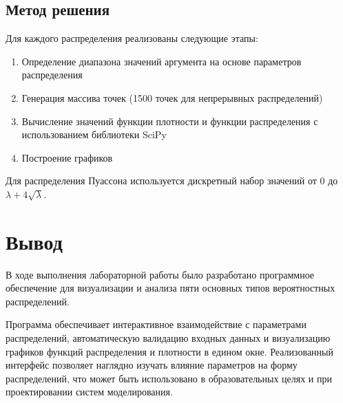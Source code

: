 \newpage
\subsection{Метод решения}

Для каждого распределения реализованы следующие этапы:

\begin{enumerate}
    \item Определение диапазона значений аргумента на основе параметров распределения
    \item Генерация массива точек (1500 точек для непрерывных распределений)
    \item Вычисление значений функции плотности и функции распределения с использованием библиотеки SciPy
    \item Построение графиков
\end{enumerate}

Для распределения Пуассона используется дискретный набор значений от 0 до $\lambda + 4\sqrt{\lambda}$.

\section{Вывод}

В ходе выполнения лабораторной работы было разработано программное обеспечение для визуализации и анализа пяти основных типов вероятностных распределений.

Программа обеспечивает интерактивное взаимодействие с параметрами распределений, автоматическую валидацию входных данных и визуализацию графиков функций распределения и плотности в едином окне. Реализованный интерфейс позволяет наглядно изучать влияние параметров на форму распределений, что может быть использовано в образовательных целях и при проектировании систем моделирования.